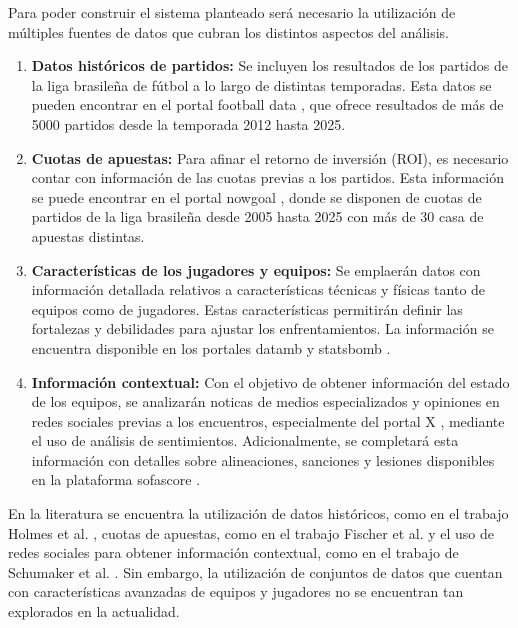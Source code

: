 Para poder construir el sistema planteado será necesario la utilización de múltiples fuentes de datos que cubran los distintos aspectos del análisis.

\begin{enumerate}
    \item \textbf{Datos históricos de partidos:} Se incluyen los resultados de los partidos de la liga brasileña de fútbol a lo largo de distintas temporadas. Esta datos se pueden encontrar en el portal football data \cite{footballData}, que ofrece resultados de más de 5000 partidos desde la temporada 2012 hasta 2025.

    \item \textbf{Cuotas de apuestas:} Para afinar el retorno de inversión (ROI), es necesario contar con información de las cuotas previas a los partidos. Esta información se puede encontrar en el portal nowgoal \cite{nowgoalOdds}, donde se disponen de cuotas de partidos de la liga brasileña desde 2005 hasta 2025 con más de 30 casa de apuestas distintas.
    
    \item \textbf{Características de los jugadores y equipos:} Se emplaerán datos con información detallada relativos a características técnicas y físicas tanto de equipos como de jugadores. Estas características permitirán definir las fortalezas y debilidades para ajustar los enfrentamientos. La información se encuentra disponible en los portales datamb \cite{datamb} y statsbomb \cite{statsbomb}.
    \item \textbf{Información contextual:} Con el objetivo de obtener información del estado de los equipos, se analizarán noticas de medios especializados y opiniones en redes sociales previas a los encuentros, especialmente del portal X \cite{twitter}, mediante el uso de análisis de sentimientos. Adicionalmente, se completará esta información con detalles sobre alineaciones, sanciones y lesiones disponibles en la plataforma sofascore \cite{sofascore}.
\end{enumerate}

En la literatura se encuentra la utilización de datos históricos, como en el trabajo Holmes et al. \cite{holmesForecastingFootballMatch2024}, cuotas de apuestas, como en el trabajo Fischer et al. \cite{Fisher2024PricingResponse} y el uso de redes sociales para obtener información contextual, como en el trabajo de Schumaker et al. \cite{Schumaker2016}. Sin embargo, la utilización de conjuntos de datos que cuentan con características avanzadas de equipos y jugadores no se encuentran tan explorados en la actualidad.

